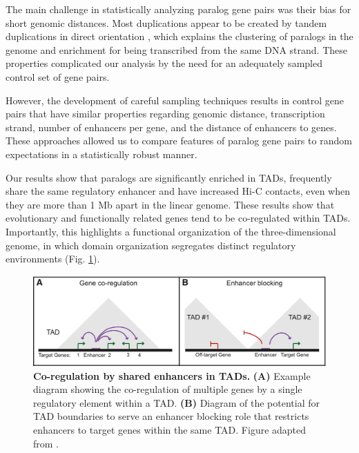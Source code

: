 \documentclass[a4paper,twoside=true,openright,parskip=full,chapterprefix=true,11pt,headings=normal,bibliography=totoc,listof=totoc,titlepage=on,captions=tableabove,draft=false]{scrreprt}
\theoremstyle{definition}
\theoremstyle{definition}
\theoremstyle{definition}
\theoremstyle{remark}
\begin{document}
The main challenge in statistically analyzing paralog gene pairs was
their bias for short genomic distances. Most duplications appear to be
created by tandem duplications in direct orientation \citep{Newman2015},
which explains the clustering of paralogs in the genome and enrichment
for being transcribed from the same DNA strand. These properties
complicated our analysis by the need for an adequately sampled control
set of gene pairs.

However, the development of careful sampling techniques results in
control gene pairs that have similar properties regarding genomic
distance, transcription strand, number of enhancers per gene, and the
distance of enhancers to genes. These approaches allowed us to compare
features of paralog gene pairs to random expectations in a statistically
robust manner.

Our results show that paralogs are significantly enriched in TADs,
frequently share the same regulatory enhancer and have increased Hi-C
contacts, even when they are more than 1 Mb apart in the linear genome.
These results show that evolutionary and functionally related genes tend
to be co-regulated within TADs. Importantly, this highlights a
functional organization of the three-dimensional genome, in which domain
organization segregates distinct regulatory environments (Fig.
\ref{fig:CoRegTAD}).

\begin{figure}

{\centering \includegraphics[width=0.8\linewidth]{figures/Dixon2016_Fig3ab} 

}

\caption{\textbf{Co-regulation by shared enhancers in TADs.}
\textbf{(A)} Example diagram showing the co-regulation of multiple genes
by a single regulatory element within a TAD. \textbf{(B)} Diagram of the
potential for TAD boundaries to serve an enhancer blocking role that
restricts enhancers to target genes within the same TAD. Figure adapted
from \citep{Dixon2016}.}\label{fig:CoRegTAD}
\end{figure}
\end{document}
